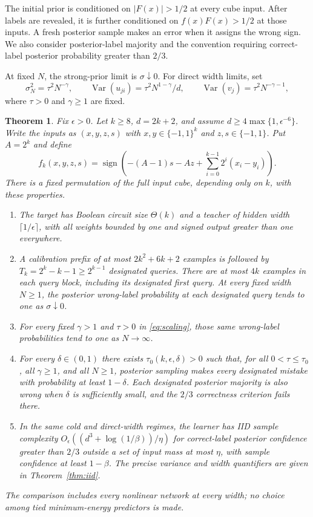 \documentclass[11pt]{article}
\newtheorem{theorem}{Theorem}
\newcommand{\sgn}{\operatorname{sign}}
\begin{document}
The initial prior is conditioned on $|F(x)|>1/2$ at every cube input.
After labels are revealed, it is further conditioned on
$f(x)F(x)>1/2$ at those inputs. A fresh posterior sample makes an error
when it assigns the wrong sign. We also consider posterior-label
majority and the convention requiring correct-label posterior
probability greater than $2/3$.

At fixed $N$, the strong-prior limit is $\sigma\downarrow0$.
For direct width limits, set
\begin{equation}\label{eq:scaling}
 \sigma_N^2=\tau^2N^{-\gamma},\qquad
 \operatorname{Var}(u_{ji})=\tau^2N^{1-\gamma}/d,
 \qquad \operatorname{Var}(v_j)=\tau^2N^{-\gamma-1},
\end{equation}
where $\tau>0$ and $\gamma\ge1$ are fixed.

\begin{theorem}\label{thm:main}
Fix $\epsilon>0$. Let $k\ge8$, $d=2k+2$, and assume
$d\ge4\max\{1,\epsilon^{-6}\}$. Write the inputs as
$(x,y,z,s)$ with $x,y\in\{-1,1\}^k$ and $z,s\in\{-1,1\}$.
Put $A=2^k$ and define
\begin{equation}\label{eq:target}
 f_k(x,y,z,s)=\sgn\left(
 -(A-1)s-Az+\sum_{i=0}^{k-1}2^i(x_i-y_i)\right).
\end{equation}
There is a fixed permutation of the full input cube, depending only on
$k$, with these properties.
\begin{enumerate}
\item The target has Boolean circuit size $\Theta(k)$ and a teacher of
hidden width $\lceil1/\epsilon\rceil$, with all weights bounded by one
and signed output greater than one everywhere.
\item A calibration prefix of at most $2k^2+6k+2$ examples is followed
by $T_k=2^k-k-1\ge2^{k-1}$ designated queries. There are at most $4k$
examples in each query block, including its designated first query.
At every fixed width $N\ge1$, the posterior wrong-label probability
at each designated query tends to one as $\sigma\downarrow0$.
\item For every fixed $\gamma>1$ and $\tau>0$ in
\eqref{eq:scaling}, those same wrong-label probabilities tend to one
as $N\to\infty$.
\item For every $\delta\in(0,1)$ there exists
$\tau_0(k,\epsilon,\delta)>0$ such that, for all
$0<\tau\le\tau_0$, all $\gamma\ge1$, and all $N\ge1$, posterior
sampling makes every designated mistake with probability at least
$1-\delta$. Each designated posterior majority is also wrong when
$\delta$ is sufficiently small, and the $2/3$ correctness criterion
fails there.
\item In the same cold and direct-width regimes, the learner has IID
sample complexity $O_\epsilon((d^3+\log(1/\beta))/\eta)$ for
correct-label posterior confidence greater than $2/3$ outside a set of
input mass at most $\eta$, with sample confidence at least $1-\beta$.
The precise variance and width quantifiers are given in
Theorem~\ref{thm:iid}.
\end{enumerate}
The comparison includes every nonlinear network at every width; no
choice among tied minimum-energy predictors is made.
\end{theorem}
\end{document}

